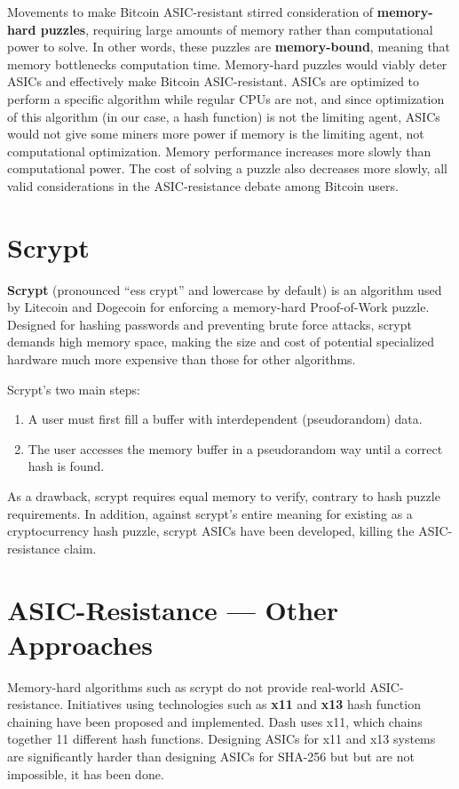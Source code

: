 \documentclass[full.tex]{subfiles}
\begin{document}
    Movements to make Bitcoin ASIC-resistant stirred consideration of            \textbf{memory-hard puzzles}, requiring large amounts of memory rather than computational power to solve. In other words, these puzzles are \textbf{memory-bound}, meaning that memory bottlenecks computation time. Memory-hard puzzles would viably deter ASICs and effectively make Bitcoin ASIC-resistant. ASICs are optimized to perform a specific algorithm while regular CPUs are not, and since optimization of this algorithm (in our case, a hash function) is not the limiting agent, ASICs would not give some miners more power if memory is the limiting agent, not computational optimization. Memory performance increases more slowly than computational power. The cost of solving a puzzle also decreases more slowly, all valid considerations in the ASIC-resistance debate among Bitcoin users.
    
    \section*{Scrypt}
    
    \textbf{Scrypt} (pronounced ``ess crypt'' and lowercase by default) is an algorithm used by Litecoin and Dogecoin for enforcing a memory-hard Proof-of-Work puzzle. Designed for hashing passwords and preventing brute force attacks, scrypt demands high memory space, making the size and cost of potential specialized hardware much more expensive than those for other algorithms. 
    
    \noindent Scrypt's two main steps:
    \begin{enumerate}
        \item A user must first fill a buffer with interdependent (pseudorandom) data. 
        \item The user accesses the memory buffer in a pseudorandom way until a correct hash is found.
    \end{enumerate}
    As a drawback, scrypt requires equal memory to verify, contrary to hash puzzle requirements. In addition, against scrypt's entire meaning for existing as a cryptocurrency hash puzzle, scrypt ASICs have been developed, killing the ASIC-resistance claim.
    
    \section*{ASIC-Resistance --- Other Approaches}
    
    Memory-hard algorithms such as scrypt do not provide real-world ASIC-resistance. Initiatives using technologies such as \textbf{x11} and \textbf{x13} hash function chaining have been proposed and implemented. Dash uses x11, which chains together 11 different hash functions. Designing ASICs for x11 and x13 systems are significantly harder than designing ASICs for SHA-256 but but are not impossible, it has been done.
    
\end{document}
